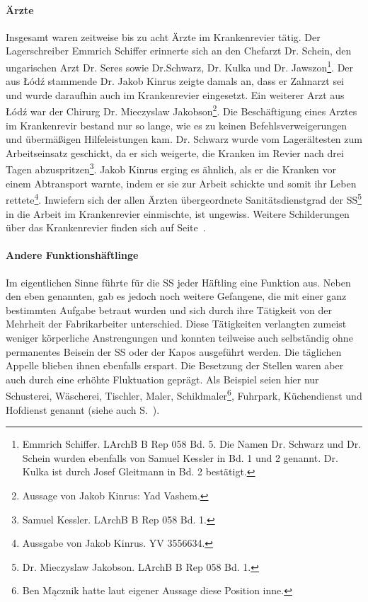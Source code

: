 \paragraph{Ärzte}
\label{arzt}
Insgesamt waren zeitweise bis zu acht Ärzte im Krankenrevier tätig. Der Lagerschreiber Emmrich Schiffer erinnerte sich an den Chefarzt Dr. Schein, den ungarischen Arzt Dr. Seres sowie Dr.Schwarz, Dr. Kulka und Dr. Jawszon\footnote{Emmrich Schiffer. LArchB B Rep 058 Bd. 5. Die Namen Dr. Schwarz und Dr. Schein wurden ebenfalls von Samuel Kessler in Bd. 1 und 2 genannt. Dr. Kulka ist durch Josef Gleitmann in Bd. 2 bestätigt.}.
Der aus \L \'od\'z stammende Dr. Jakob Kinrus zeigte damals an, dass er Zahnarzt sei und wurde daraufhin auch im Krankenrevier eingesetzt. Ein weiterer Arzt aus \L \'od\'z war der Chirurg Dr. Mieczyslaw Jakobson\footnote{Aussage von Jakob Kinrus: Yad Vashem.}.
Die Beschäftigung eines Arztes im Krankenrevir bestand nur so lange, wie es zu keinen Befehlsverweigerungen und übermäßigen Hilfeleistungen kam.
Dr. Schwarz wurde vom Lagerältesten zum Arbeitseinsatz geschickt, da er sich weigerte, die Kranken im Revier nach drei Tagen \glqq abzuspritzen\grqq\footnote{Samuel Kessler. LArchB B Rep 058 Bd. 1.}.
Jakob Kinrus erging es ähnlich, als er die Kranken vor einem Abtransport warnte, indem er sie zur Arbeit schickte und somit ihr Leben rettete\footnote{Aussgabe von Jakob Kinrus. YV 3556634.}.
\newline
Inwiefern sich der allen Ärzten übergeordnete Sanitätsdienstgrad der SS\footnote{Dr. Mieczyslaw Jakobson. LArchB B Rep 058 Bd. 1.} in die Arbeit im Krankenrevier einmischte, ist ungewiss. Weitere Schilderungen über das Krankenrevier finden sich auf Seite~\pageref{krank}.

\paragraph{Andere Funktionshäftlinge}
Im eigentlichen Sinne führte für die SS jeder Häftling eine Funktion aus. Neben den eben genannten, gab es jedoch noch weitere Gefangene, die mit einer ganz bestimmten Aufgabe betraut wurden und sich durch ihre Tätigkeit von der Mehrheit der Fabrikarbeiter unterschied. Diese Tätigkeiten verlangten zumeist weniger körperliche Anstrengungen und konnten teilweise auch selbständig ohne permanentes Beisein der SS oder der Kapos ausgeführt werden. Die täglichen Appelle blieben ihnen ebenfalls erspart. Die Besetzung der Stellen waren aber auch durch eine erhöhte Fluktuation geprägt.\newline
Als Beispiel seien hier nur Schusterei, Wäscherei, Tischler, Maler, Schildmaler\footnote{Ben Mącznik hatte laut eigener Aussage diese Position inne.}, Fuhrpark, Küchendienst und Hofdienst genannt (siehe auch S.~\pageref{lagerarbeit}).

